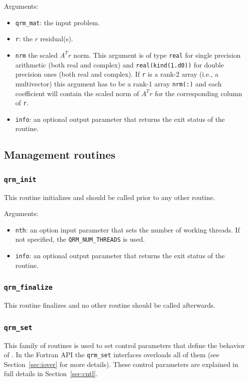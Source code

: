 \documentclass[11pt]{article}
\begin{document}
\noindent Arguments:
\begin{itemize}
\item \texttt{qrm\_mat}: the input problem.
\item \texttt{r}: the $r$ residual(s).
\item \texttt{nrm} the scaled $A^Tr$ norm. This argument is of type
  \texttt{real} for single precision arithmetic (both real and
  complex) and \texttt{real(kind(1.d0))} for double precision ones
  (both real and complex). If \texttt{r} is a rank-2 array
  (i.e., a multivector) this argument has to be a rank-1 array
  \texttt{nrm(:)} and each coefficient will contain the scaled norm of
  $A^Tr$ for the corresponding column of \texttt{r}.
\item \texttt{info}: an optional output parameter that returns the
  exit status of the routine.
\end{itemize}



\subsection{Management routines}
\label{sec:mgmt}

\subsubsection{\texttt{qrm\_init}}
\label{sec:init}
This routine initializes \qrm and should be called prior to any other
\qrm routine.


\noindent Arguments:
\begin{itemize}
\item \texttt{nth}: an option input parameter that sets the number of
  working threads. If not specified, the \texttt{QRM\_NUM\_THREADS} is
  used.
\item \texttt{info}: an optional output parameter that returns the
  exit status of the routine.
\end{itemize}

\subsubsection{\texttt{qrm\_finalize}}
\label{sec:destroy}
This routine finalizes \qrm and no other \qrm routine should be called afterwards.


\subsubsection{\texttt{qrm\_set}}
\label{sec:set}
This family of routines is used to set control parameters that define
the behavior of \qrm. In the Fortran API the \texttt{qrm\_set}
interfaces overloads all of them (see Section~\ref{sec:iover} for more
details). These control parameters are explained in full details in
Section~\ref{sec:cntl}.
\end{document}
